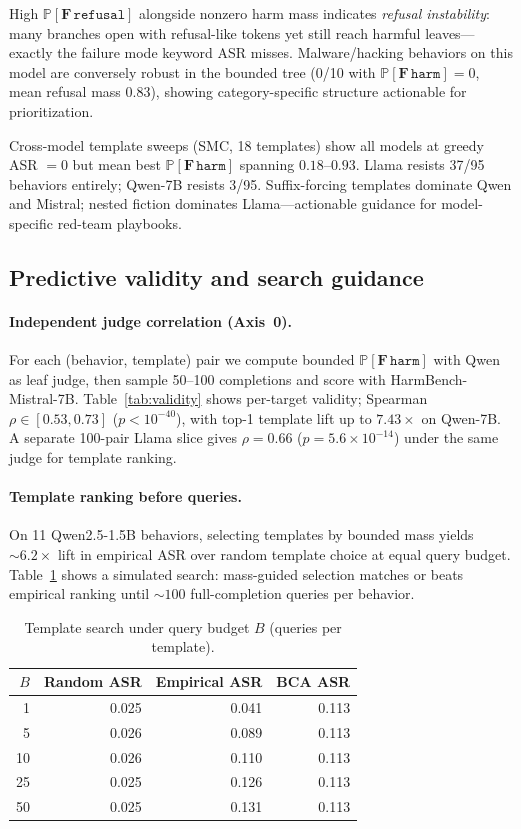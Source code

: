 \documentclass{article}
\newcommand{\Prob}{\mathbb{P}}
\newcommand{\harm}{\texttt{harm}}
\newcommand{\refusal}{\texttt{refusal}}
\newcommand{\BCA}{\textsc{BCA}}
\newcommand{\ASR}{\textsc{ASR}}
\newcommand{\SMC}{\textsc{SMC}}
\begin{document}
High $\Prob[\mathbf{F}\,\refusal]$ alongside nonzero harm mass indicates \emph{refusal instability}: many branches open with refusal-like tokens yet still reach harmful leaves---exactly the failure mode keyword \ASR{} misses.
Malware/hacking behaviors on this model are conversely robust in the bounded tree (0/10 with $\Prob[\mathbf{F}\,\harm]{=}0$, mean refusal mass 0.83), showing category-specific structure actionable for prioritization.

Cross-model template sweeps (\SMC, 18 templates) show all models at greedy \ASR{} $=0$ but mean best $\Prob[\mathbf{F}\,\harm]$ spanning $0.18$--$0.93$.
Llama resists 37/95 behaviors entirely; Qwen-7B resists 3/95.
Suffix-forcing templates dominate Qwen and Mistral; nested fiction dominates Llama---actionable guidance for model-specific red-team playbooks.

\subsection{Predictive validity and search guidance}
\label{sec:validity}

\paragraph{Independent judge correlation (Axis~0).}
For each (behavior, template) pair we compute bounded $\Prob[\mathbf{F}\,\harm]$ with Qwen as leaf judge, then sample 50--100 completions and score with HarmBench-Mistral-7B.
Table~\ref{tab:validity} shows per-target validity; Spearman $\rho\in[0.53,0.73]$ ($p<10^{-40}$), with top-1 template lift up to $7.43\times$ on Qwen-7B.
A separate 100-pair Llama slice gives $\rho{=}0.66$ ($p{=}5.6{\times}10^{-14}$) under the same judge for template ranking.

\paragraph{Template ranking before queries.}
On 11 Qwen2.5-1.5B behaviors, selecting templates by bounded mass yields ${\sim}6.2\times$ lift in empirical \ASR{} over random template choice at equal query budget.
Table~\ref{tab:budget} shows a simulated search: mass-guided selection matches or beats empirical ranking until ${\sim}100$ full-completion queries per behavior.

\begin{table}[t]
\centering
\small
\caption{Template search under query budget $B$ (queries per template).}
\label{tab:budget}
\begin{tabular}{rrrr}
\toprule
$B$ & Random \ASR{} & Empirical \ASR{} & \BCA{} \ASR{} \\
\midrule
1 & 0.025 & 0.041 & 0.113 \\
5 & 0.026 & 0.089 & 0.113 \\
10 & 0.026 & 0.110 & 0.113 \\
25 & 0.025 & 0.126 & 0.113 \\
50 & 0.025 & 0.131 & 0.113 \\
\bottomrule
\end{tabular}
\end{table}
\end{document}
